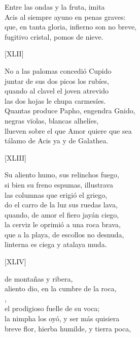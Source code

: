\documentclass[11pt,a4paper,twoside]{article}
\begin{document}
Entre las ondas y la fruta, imita\\
Acis al siempre ayuno en penas graves:\\
que, en tanta gloria, infierno son no breve,\\
fugitivo cristal, pomos de nieve.\par\pend
%
\begin{center}
	[XLII]
\end{center}\pstart
No a las palomas concedió Cupido\\
juntar de sus dos picos los rubíes,\\
quando al clavel el joven atrevido\\
las dos hojas le chupa carmesíes.\\
Quantas produce Papho, engendra Gnido,\\
negras vïolas, blancas alhelíes,\\
llueven sobre el que Amor quiere que sea\\
tálamo de Acis ya y de Galathea.\par\pend
%
\begin{center}
	[XLIII]
\end{center}\pstart
Su aliento humo, sus relinchos fuego,\\
si bien su freno espumas, illustrava\\
las columnas  que erigió el griego,\\
do el carro de la luz sus ruedas lava,\\ quando, de amor el fiero jayán ciego,\\
la cerviz le oprimió a una roca brava,\\
que a la playa, de escollos no desnuda,\\
linterna es ciega y atalaya muda.\par\pend
\relax
\vfill
\newpage
%
\begin{center}
	[XLIV]
\end{center}\pstart
{} de montañas y ribera,\\
aliento dio, en la cumbre de la roca,\\
,\\
el prodigioso fuelle de su voca;\\
la nimpha los oyó, y ser más quisiera\\
breve flor, hierba humilde, y tierra poca,\\
\end{document}
